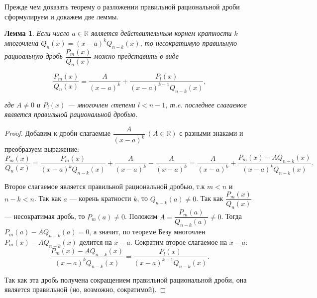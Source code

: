 \documentclass[12pt]{report}
\numberwithin{equation}{section}
\newtheorem{lemma}{Лемма}[section]
\begin{document}
Прежде чем доказать теорему о разложении правильной рациональной дроби сформулируем и докажем две леммы.
\begin{lemma} \label{lemm:1:1}
Если число $a \in \mathbb{R}$  является действительным корнем кратности $k$ многочлена $Q_n(x) = (x-a)^k Q_{n-k}(x)$, то несократимую правильную рациоальную дробь $\dfrac{P_m(x)}{Q_n(x)}$ можно представить в виде

\[\frac{P_m(x)}{Q_n(x)} = \frac{A}{(x-a)^k} + \frac{P_l(x)}{(x-a)^{k-1}Q_{n-k}(x)}, \]

где $A \neq 0$ и $P_l(x)$ ---  многочлен cтепени $l < n - 1$,  т.e. последнее слагаемое является правильной рациональной дробью.
\end{lemma}
\begin{proof}
Добавим к дроби слагаемые $\dfrac{A}{(x-a)^k}~(A \in \mathbb{R})$ с разными знаками и преобразуем выражение:
\[ \frac{P_m(x)}{Q_n(x)} =\frac{P_m(x)}{(x-a)^k Q_{n-k}(x)} + \frac{A}{(x-a)^k} - \frac{A}{(x-a)^k} =  \frac{A}{(x-a)^k} + \frac{P_m(x) - AQ_{n-k}(x)}{(x-a)^k Q_{n-k}(x)}.\]

Второе слагаемое является правильной рациональной дробью, т.к $m < n$ и $n -k < n$. Так как $a$ — корень кратности $k$, то $Q_{n-k}(a) \neq 0$. Так как $\dfrac{P_m(x)}{Q_n(x)}$ --- несократимая дробь, то $P_m(a) \neq 0$. Положим $A = \dfrac{P_m(a)}{Q_{n-k}(a)} \neq 0$. Тогда $P_m(a) - AQ_{n-k}(a) = 0$, а значит, по теореме Безу многочлен $P_m(x) - A Q_{n-k}(x)$ делится на $x-a$. Сократим второе слагаемое на $x-a$:
\begin{equation}\label{eq:2}
\frac{P_m(x) - AQ_{n-k}(x)}{(x-a)^kQ_{n-k}(x)} = \frac{P_l(x)}{(x-a)^{k-1} Q_{n-k}(x)}. 
\end{equation}

Так как эта дробь получена сокращением правильной рациональной дроби, она является правильной (но, возможно, сократимой). 
\end{proof}
\end{document}
